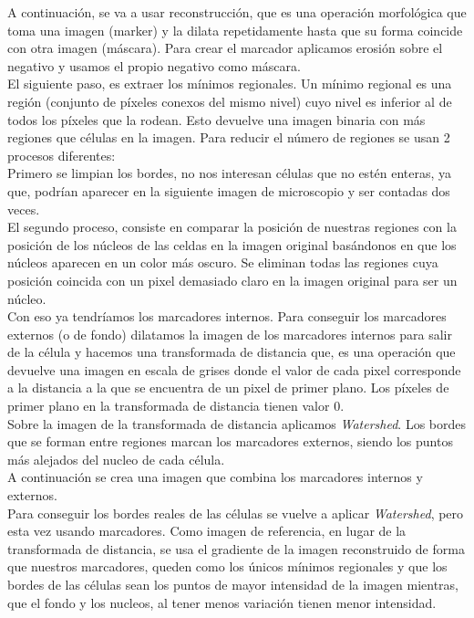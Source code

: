 \documentclass[a4paper,12pt]{report}
\begin{document}
A continuación, se va a usar reconstrucción, que es una operación morfológica que toma una imagen (marker) y la dilata repetidamente hasta que su forma coincide con otra imagen (máscara). Para crear el marcador aplicamos erosión sobre el negativo y usamos el propio negativo como máscara.\\ 

El siguiente paso, es extraer los mínimos regionales. Un mínimo regional es una región (conjunto de píxeles conexos del mismo nivel) cuyo nivel es inferior al de todos los píxeles que la rodean. Esto devuelve una imagen binaria con más regiones que células en la imagen. Para reducir el número de regiones se usan 2 procesos diferentes:\\

Primero se limpian los bordes, no nos interesan células que no estén enteras, ya que, podrían aparecer en la siguiente imagen de microscopio y ser contadas dos veces.\\

El segundo proceso, consiste en comparar la posición de nuestras regiones con la posición de los núcleos de las celdas en la imagen original basándonos en que los núcleos aparecen en un color más oscuro. Se eliminan todas las regiones cuya posición coincida con un pixel demasiado claro en la imagen original para ser un núcleo.\\

Con eso ya tendríamos los marcadores internos. Para conseguir los marcadores externos (o de fondo) dilatamos la imagen de los marcadores internos para salir de la célula y hacemos una transformada de distancia que, es una operación que devuelve una imagen en escala de grises donde el valor de cada pixel corresponde a la distancia a la que se encuentra de un pixel de primer plano. Los píxeles de primer plano en la transformada de distancia tienen valor 0.\\

Sobre la imagen de la transformada de distancia aplicamos  \emph{Watershed}. Los bordes que se forman entre regiones marcan los marcadores externos, siendo los puntos más alejados del nucleo de cada célula.\\

A continuación se crea una imagen que combina los marcadores internos y externos. \\

Para conseguir los bordes reales de las células se vuelve a aplicar  \emph{Watershed}, pero esta vez usando marcadores. Como imagen de referencia, en lugar de la transformada de distancia, se usa el gradiente de la imagen reconstruido de forma que nuestros marcadores, queden como los únicos mínimos regionales y que los bordes de las células sean los puntos de mayor intensidad de la imagen mientras, que el fondo y los nucleos, al tener menos variación tienen menor intensidad.\\
\end{document}
